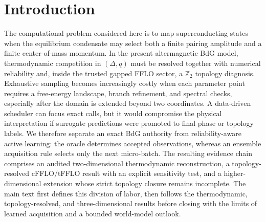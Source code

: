 \section{Introduction}
The computational problem considered here is to map superconducting states when the equilibrium condensate may select both a finite pairing amplitude and a finite center-of-mass momentum. In the present altermagnetic BdG model, thermodynamic competition in $(\Delta,q)$ must be resolved together with numerical reliability and, inside the trusted gapped FFLO sector, a $\mathbb Z_2$ topology diagnosis. Exhaustive sampling becomes increasingly costly when each parameter point requires a free-energy landscape, branch refinement, and spectral checks, especially after the domain is extended beyond two coordinates. A data-driven scheduler can focus exact calls, but it would compromise the physical interpretation if surrogate predictions were promoted to final phase or topology labels. We therefore separate an exact BdG authority from reliability-aware active learning: the oracle determines accepted observations, whereas an ensemble acquisition rule selects only the next micro-batch. The resulting evidence chain comprises an audited two-dimensional thermodynamic reconstruction, a topology-resolved cFFLO/tFFLO result with an explicit sensitivity test, and a higher-dimensional extension whose strict topology closure remains incomplete. The main text first defines this division of labor, then follows the thermodynamic, topology-resolved, and three-dimensional results before closing with the limits of learned acquisition and a bounded world-model outlook.
